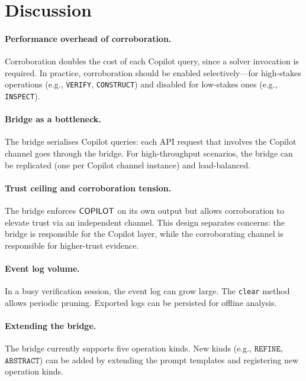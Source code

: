 \documentclass[11pt]{article}
\begin{document}
\section{Discussion}\label{sec:discussion}

\paragraph{Performance overhead of corroboration.}
Corroboration doubles the cost of each Copilot query,
since a solver invocation is required.  In practice,
corroboration should be enabled selectively---for
high-stakes operations (e.g., \texttt{VERIFY},
\texttt{CONSTRUCT}) and disabled for low-stakes ones
(e.g., \texttt{INSPECT}).

\paragraph{Bridge as a bottleneck.}
The bridge serialises Copilot queries: each API request
that involves the Copilot channel goes through the bridge.
For high-throughput scenarios, the bridge can be replicated
(one per Copilot channel instance) and load-balanced.

\paragraph{Trust ceiling and corroboration tension.}
The bridge enforces $\mathsf{COPILOT}$ on its own output but
allows corroboration to elevate trust via an independent
channel.  This design separates concerns: the bridge is
responsible for the Copilot layer, while the corroborating
channel is responsible for higher-trust evidence.

\paragraph{Event log volume.}
In a busy verification session, the event log can grow
large.  The \texttt{clear} method allows periodic pruning.
Exported logs can be persisted for offline analysis.

\paragraph{Extending the bridge.}
The bridge currently supports five operation kinds.  New
kinds (e.g., $\texttt{REFINE}$, $\texttt{ABSTRACT}$) can
be added by extending the prompt templates and registering
new operation kinds.
\end{document}
